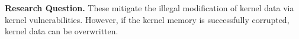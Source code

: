 {\bf Research Question.}
These mitigate the illegal modification of kernel data via kernel
vulnerabilities.
However, if the kernel memory is successfully corrupted, kernel data can be
overwritten.
%
%
